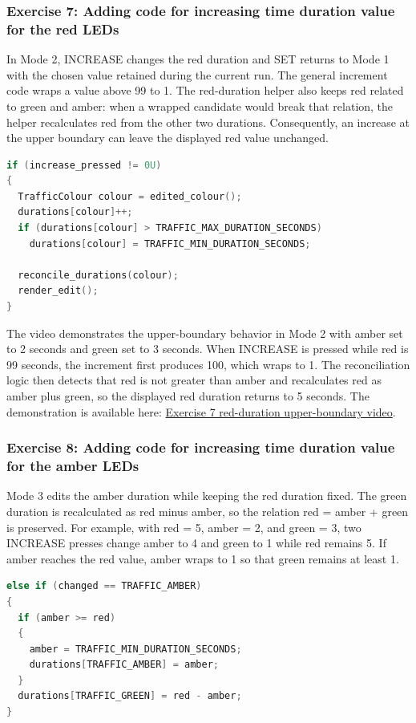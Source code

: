 \subsubsection{Exercise 7: Adding code for increasing time duration value for the red LEDs}
In Mode 2, INCREASE changes the red duration and SET returns to Mode 1 with the chosen value retained during the current run. The general increment code wraps a value above 99 to 1. The red-duration helper also keeps red related to green and amber: when a wrapped candidate would break that relation, the helper recalculates red from the other two durations. Consequently, an increase at the upper boundary can leave the displayed red value unchanged.

\begin{lstlisting}[caption={Increasing the selected duration},language=C]
if (increase_pressed != 0U)
{
  TrafficColour colour = edited_colour();
  durations[colour]++;
  if (durations[colour] > TRAFFIC_MAX_DURATION_SECONDS)
    durations[colour] = TRAFFIC_MIN_DURATION_SECONDS;

  reconcile_durations(colour);
  render_edit();
}
\end{lstlisting}

The video demonstrates the upper-boundary behavior in Mode 2 with amber set to 2 seconds and green set to 3 seconds. When INCREASE is pressed while red is 99 seconds, the increment first produces 100, which wraps to 1. The reconciliation logic then detects that red is not greater than amber and recalculates red as amber plus green, so the displayed red duration returns to 5 seconds. The demonstration is available here: \href{https://github.com/quangnguyencomeng/CO3009-261-CC-2453052/blob/main/Lab/lab_reports/source/vids/lab3_ex7.mp4}{Exercise 7 red-duration upper-boundary video}.

\subsubsection{Exercise 8: Adding code for increasing time duration value for the amber LEDs}
Mode 3 edits the amber duration while keeping the red duration fixed. The green duration is recalculated as red minus amber, so the relation red = amber + green is preserved. For example, with red = 5, amber = 2, and green = 3, two INCREASE presses change amber to 4 and green to 1 while red remains 5. If amber reaches the red value, amber wraps to 1 so that green remains at least 1.

\begin{lstlisting}[caption={Keeping red fixed while amber is edited},language=C]
else if (changed == TRAFFIC_AMBER)
{
  if (amber >= red)
  {
    amber = TRAFFIC_MIN_DURATION_SECONDS;
    durations[TRAFFIC_AMBER] = amber;
  }
  durations[TRAFFIC_GREEN] = red - amber;
}
\end{lstlisting}

